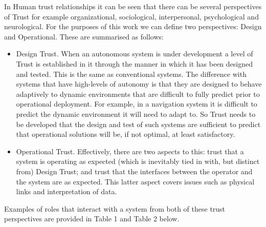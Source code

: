 In Human trust relationships it can be seen that there can be several perspectives of Trust for example organizational, sociological, interpersonal, psychological and neurological\cite{Lee2004}.
For the purposes of this work we can define two perspectives: Design and Operational.
These are summarised as follows:
\begin{itemize}
	\item Design Trust.
	When an autonomous system is under development a level of Trust is established in it through the manner in which it has been designed and tested.
	This is the same as conventional systems.
	The difference with systems that have high-levels of autonomy is that they are designed to behave adaptively to dynamic environments that are difficult to fully predict prior to operational deployment.
	For example, in a navigation system it is difficult to predict the dynamic environment it will need to adapt to.
	So Trust needs to be developed that the design and test of such systems are sufficient to predict that operational solutions will be, if not optimal, at least satisfactory.
	\item Operational Trust.
	Effectively, there are two aspects to this: trust that a system is operating as expected (which is inevitably tied in with, but distinct from) Design Trust; and trust that the interfaces between the operator and the system are as expected.
	This latter aspect covers issues such as physical links and interpretation of data.
\end{itemize}

Examples of roles that interact with a system from both of these trust perspectives are provided in Table 1 and Table 2 below.


